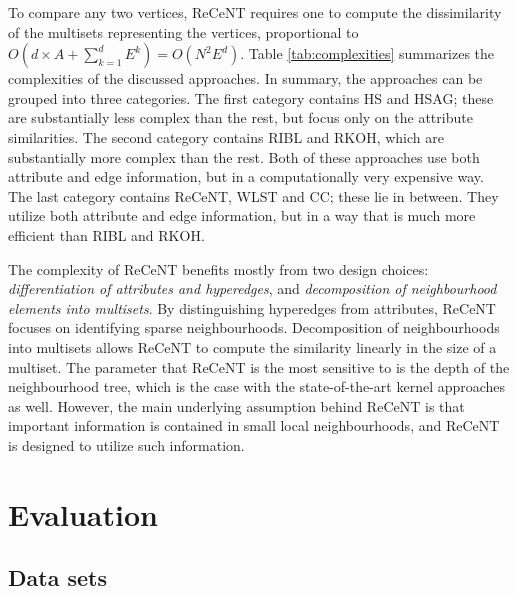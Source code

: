 To compare any two vertices, ReCeNT requires one to compute the dissimilarity of the multisets representing the vertices, proportional to $O(d\times A + \sum_{k=1}^d E^k) = O\left (N^2 E^d \right )$.
Table \ref{tab:complexities} summarizes the complexities of the discussed approaches.
In summary, the approaches can be grouped into three categories.
The first category contains HS and HSAG; these are substantially less complex than the rest, but focus only on the attribute similarities.
The second category contains RIBL and RKOH, which are substantially more complex than the rest.
Both of these approaches use both attribute and edge information, but in a computationally very expensive way.
The last category contains ReCeNT, WLST and CC; these lie in between. They utilize both attribute and edge information, but in a way that is much more efficient than RIBL and RKOH.
\vspace{2pt}



The complexity of ReCeNT benefits mostly from two design choices: \textit{differentiation of attributes and hyperedges}, and \textit{decomposition of neighbourhood elements into multisets}.
By distinguishing hyperedges from attributes, ReCeNT focuses on identifying sparse neighbourhoods.  
Decomposition of neighbourhoods into multisets allows ReCeNT to compute the similarity linearly in the size of a multiset. 
The parameter that ReCeNT is the most sensitive to is the depth of the neighbourhood tree, which is the case with the state-of-the-art kernel approaches as well.
However, the main underlying assumption behind ReCeNT is that important information is contained in small local neighbourhoods, and ReCeNT is designed to utilize such information.


\section{Evaluation}
\label{sec:Evaluation}



\subsection{Data sets}




